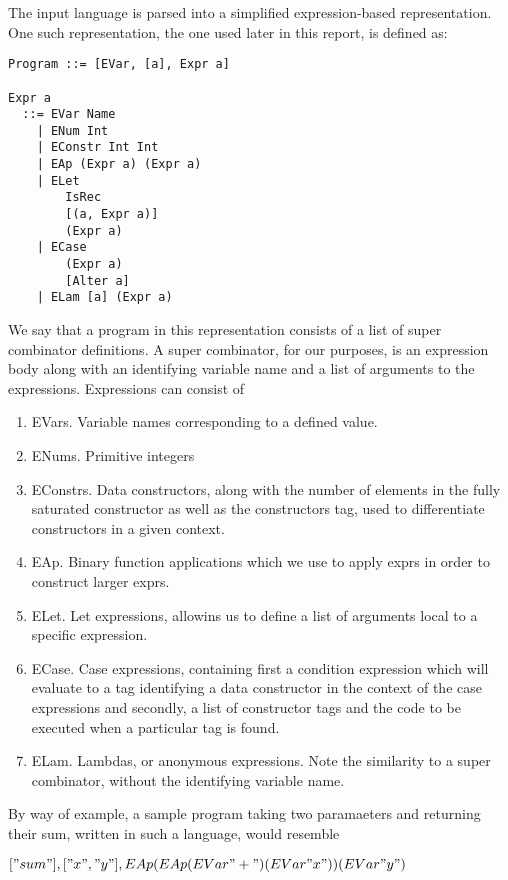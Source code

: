 \documentclass[11pt]{article}
\begin{document}
The input language is parsed into a simplified expression-based representation.
One such representation, the one used later in this report, is defined as:

\begin{verbatim}
Program ::= [EVar, [a], Expr a]

Expr a
  ::= EVar Name
    | ENum Int
    | EConstr Int Int
    | EAp (Expr a) (Expr a)
    | ELet 
        IsRec
        [(a, Expr a)]
        (Expr a)
    | ECase
        (Expr a)
        [Alter a]
    | ELam [a] (Expr a)
\end{verbatim}

\noindent We say that a program in this representation consists of a list of
super combinator definitions. A super combinator, for our purposes, is an 
expression body along with an identifying variable name and a list of arguments
to the expressions. Expressions can consist of

\begin{enumerate}
	\item EVars. Variable names corresponding to a defined value.
	\item ENums. Primitive integers
	\item EConstrs. Data constructors, along with the number of elements in the
		  fully saturated constructor as well as the constructors tag, used to
		  differentiate constructors in a given context.
	\item EAp. Binary function applications which we use to apply exprs in order
		  to construct larger exprs.
	\item ELet. Let expressions, allowins us to define a list of arguments local
		  to a specific expression.
	\item ECase. Case expressions, containing first a condition expression which
		  will evaluate to a tag identifying a data constructor in the context
		  of the case expressions and secondly, a list of constructor tags and 
		  the code to be executed when a particular tag is found.
	\item ELam. Lambdas, or anonymous expressions. Note the similarity to a 
		  super combinator, without the identifying variable name.
\end{enumerate}

\noindent By way of example, a sample program taking two paramaeters and returning
their sum, written in such a language, would resemble

\begin{center} \( ["sum"], ["x", "y"], EAp (EAp (EVar "+") (EVar "x")) (EVar "y") \) \end{center}
\end{document}
